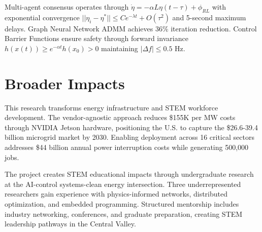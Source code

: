 \documentclass[10pt]{article}
\begin{document}
Multi-agent consensus operates through $\dot{\eta} = -\alpha L\eta(t - \tau) + \phi_{RL}$ with exponential convergence $||\eta_i - \eta^*|| \leq Ce^{-\lambda t} + O(\tau^2)$ and 5-second maximum delays. Graph Neural Network ADMM achieves 36\% iteration reduction. Control Barrier Functions ensure safety through forward invariance $h(x(t)) \geq e^{-\alpha t}h(x_0) > 0$ maintaining $|\Delta f| \leq 0.5$ Hz.

\section*{Broader Impacts}

This research transforms energy infrastructure and STEM workforce development. The vendor-agnostic approach reduces \$155K per MW costs through NVIDIA Jetson hardware, positioning the U.S. to capture the \$26.6-39.4 billion microgrid market by 2030. Enabling deployment across 16 critical sectors addresses \$44 billion annual power interruption costs while generating 500,000 jobs.

The project creates STEM educational impacts through undergraduate research at the AI-control systems-clean energy intersection. Three underrepresented researchers gain experience with physics-informed networks, distributed optimization, and embedded programming. Structured mentorship includes industry networking, conferences, and graduate preparation, creating STEM leadership pathways in the Central Valley.
\end{document}

